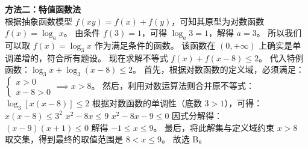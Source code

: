 \begin{solution}
    \textbf{方法二：特值函数法} \\
    根据抽象函数模型 $f(xy)=f(x)+f(y)$，可知其原型为对数函数 $f(x) = \log_a x$。
    由条件 $f(3)=1$，可得 $\log_a 3 = 1$，解得 $a=3$。
    所以我们可以取 $f(x) = \log_3 x$ 作为满足条件的函数。
    该函数在 $(0, +\infty)$ 上确实是单调递增的，符合所有题设。
    现在求解不等式 $f(x)+f(x-8) \le 2$。
    代入特例函数：$\log_3 x + \log_3 (x-8) \le 2$。
    首先，根据对数函数的定义域，必须满足：
    $\begin{cases} x > 0 \\ x-8 > 0 \end{cases} \implies x > 8$。
    然后，利用对数运算法则合并原不等式：
    $\log_3 [x(x-8)] \le 2$
    根据对数函数的单调性（底数 $3>1$），可得：
    $x(x-8) \le 3^2$
    $x^2 - 8x \le 9$
    $x^2 - 8x - 9 \le 0$
    因式分解得：
    $(x-9)(x+1) \le 0$
    解得 $-1 \le x \le 9$。
    最后，将此解集与定义域约束 $x>8$ 取交集，得到最终的取值范围是 $8 < x \le 9$。
    故选 B。
\end{solution}